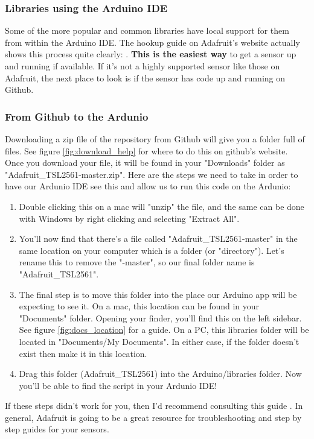 \documentclass[a4paper]{article}
\begin{document}
\subsubsection{Libraries using the Arduino IDE}
Some of the more popular and common libraries have local support for them from within the Arduino IDE. The hookup guide on Adafruit's website actually shows this process quite clearly: \cite{arduino_guide}. \textbf{This is the easiest way} to get a sensor up and running if available. If it's not a highly supported sensor like those on Adafruit, the next place to look is if the sensor has code up and running on Github.

\subsubsection{From Github to the Ardunio}
Downloading a zip file of the repository from Github will give you a folder full of files. See figure \ref{fig:download_help} for where to do this on github's website. Once you download your file, it will be found in your "Downloads" folder as "Adafruit\_TSL2561-master.zip". Here are the steps we need to take in order to have our Ardunio IDE see this and allow us to run this code on the Ardunio:

\begin{enumerate}
  \item Double clicking this on a mac will "unzip" the file, and the same can be done with Windows by right clicking and selecting "Extract All".
  \item You'll now find that there's a file called "Adafruit\_TSL2561-master" in the same location on your computer which is a folder (or "directory"). Let's rename this to remove the "-master", so our final folder name is "Adafruit\_TSL2561".
  \item The final step is to move this folder into the place our Arduino app will be expecting to see it. On a mac, this location can be found in your "Documents" folder. Opening your finder, you'll find this on the left sidebar. See figure \ref{fig:docs_location} for a guide. On a PC, this libraries folder will be located in "Documents/My Documents". In either case, if the folder doesn't exist then make it in this location.
  \item Drag this folder (Adafruit\_TSL2561) into the Arduino/libraries folder. Now you'll be able to find the script in your Ardunio IDE!
\end{enumerate}

\noindent
If these steps didn't work for you, then I'd recommend consulting this guide \cite{arduino_library_guide}. In general, Adafruit is going to be a great resource for troubleshooting and step by step guides for your sensors.
\end{document}
